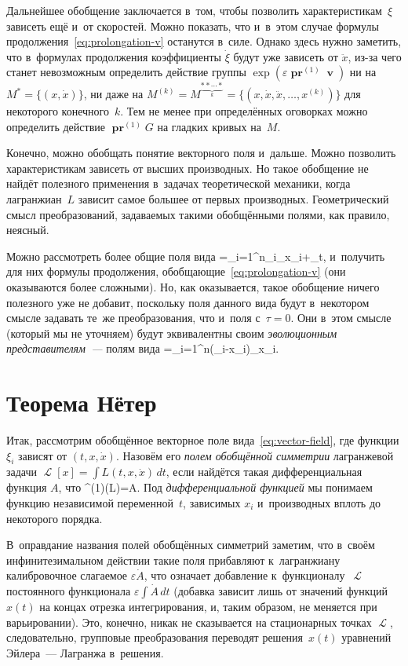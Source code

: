 \documentclass[a4paper,11pt]{article}
\def\[#1\]{\begin{align*}#1\end{align*}}
\newcommand\eqtag[1]{\refstepcounter{equation}\tag{\theequation}\label{#1}}
\theoremstyle{definition}
\begin{document}
Дальнейшее обобщение заключается в~том, чтобы позволить характеристикам~$\xi$
зависеть ещё и~от скоростей. Можно показать, что и~в~этом случае формулы
продолжения~\eqref{eq:prolongation-v} останутся в~силе. Однако здесь нужно
заметить, что в~формулах продолжения коэффициенты $\dot\xi$ будут уже зависеть
от $\ddot x$, из-за чего станет невозможным определить действие группы
$\exp(\varepsilon\operatorname{\symbf{pr}}^{(1)}\mbfv)$ ни на $M^*=\{(x,\dot
x)\}$, ни даже на $M^{(k)}=M^{\underbrace{**\cdots*}_k}=\{(x,\dot x,\ddot
x,\ldots,x^{(k)})\}$ для некоторого конечного~$k$. Тем не менее при
определённых оговорках можно определить действие
$\operatorname{\symbf{pr}}^{(1)}G$ на гладких кривых на~$M$.

Конечно, можно обобщать понятие векторного поля и~дальше. Можно позволить
характеристикам зависеть от высших производных. Но такое обобщение не найдёт
полезного применения в~задачах теоретической механики, когда лагранжиан~$L$
зависит самое большее от первых производных. Геометрический смысл
преобразований, задаваемых такими обобщёнными полями, как правило, неясный.

Можно рассмотреть более общие поля вида
	\[
	\mbfv=\sum_{i=1}^n\xi_i\partial_{x_i}+\tau\partial_t,
	\]
и~получить для них формулы продолжения, обобщающие~\eqref{eq:prolongation-v}
(они оказываются более сложными). Но, как оказывается, такое обобщение ничего
полезного уже не добавит, поскольку поля данного вида будут в~некотором смысле
задавать те~же преобразования, что и~поля с~$\tau=0$. Они в~этом смысле
(который мы не уточняем) будут эквивалентны своим \emph{эволюционным
представителям~—\/} полям вида
	\[
	\tilde\mbfv=\sum_{i=1}^n(\xi_i-\tau\dot x_i)\partial_{x_i}.
	\]

\section{Теорема Нётер}

Итак, рассмотрим обобщённое векторное поле вида~\eqref{eq:vector-field}, где
функции $\xi_i$ зависят от $(t,x,\dot x)$. Назовём его \emph{полем обобщённой
симметрии\/} лагранжевой задачи $\mscrL[x]=\int L(t,x,\dot x)\,dt$, если
найдётся такая дифференциальная функция $A$, что
	\[
	\operatorname{\symbf{pr}}^{(1)}\mbfv(L)=\dot A.
	\eqtag{eq:symmetry-cond}
	\]
Под \emph{дифференциальной функцией\/} мы понимаем функцию независимой
переменной~$t$, зависимых $x_i$ и~производных вплоть до некоторого порядка.

В~оправдание названия полей обобщённых симметрий заметим, что в~своём
инфинитезимальном действии такие поля прибавляют к~лагранжиану калибровочное
слагаемое $\varepsilon\dot A$, что означает добавление к~функционалу~$\mscrL$
постоянного функционала $\varepsilon\int\dot A\,dt$ (добавка зависит лишь от
значений функций $x(t)$ на концах отрезка интегрирования, и, таким образом, не
меняется при варьировании). Это, конечно, никак не сказывается на стационарных
точках $\mscrL$, следовательно, групповые преобразования переводят
решения~$x(t)$ уравнений Эйлера~— Лагранжа в~решения.
\end{document}
